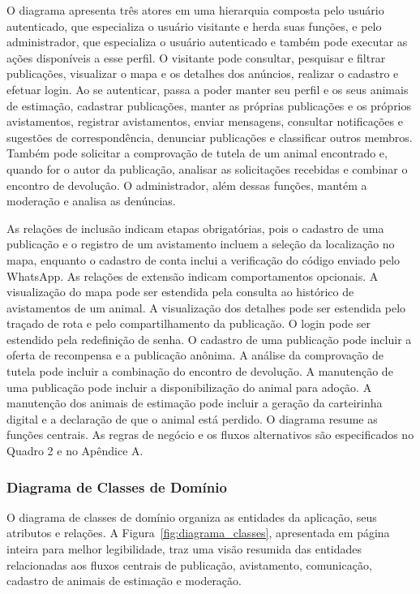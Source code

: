 O diagrama apresenta três atores em uma hierarquia composta pelo usuário autenticado, que especializa o usuário visitante e herda suas funções, e pelo administrador, que especializa o usuário autenticado e também pode executar as ações disponíveis a esse perfil. O visitante pode consultar, pesquisar e filtrar publicações, visualizar o mapa e os detalhes dos anúncios, realizar o cadastro e efetuar login. Ao se autenticar, passa a poder manter seu perfil e os seus animais de estimação, cadastrar publicações, manter as próprias publicações e os próprios avistamentos, registrar avistamentos, enviar mensagens, consultar notificações e sugestões de correspondência, denunciar publicações e classificar outros membros. Também pode solicitar a comprovação de tutela de um animal encontrado e, quando for o autor da publicação, analisar as solicitações recebidas e combinar o encontro de devolução. O administrador, além dessas funções, mantém a moderação e analisa as denúncias.

As relações de inclusão indicam etapas obrigatórias, pois o cadastro de uma publicação e o registro de um avistamento incluem a seleção da localização no mapa, enquanto o cadastro de conta inclui a verificação do código enviado pelo WhatsApp. As relações de extensão indicam comportamentos opcionais. A visualização do mapa pode ser estendida pela consulta ao histórico de avistamentos de um animal. A visualização dos detalhes pode ser estendida pelo traçado de rota e pelo compartilhamento da publicação. O login pode ser estendido pela redefinição de senha. O cadastro de uma publicação pode incluir a oferta de recompensa e a publicação anônima. A análise da comprovação de tutela pode incluir a combinação do encontro de devolução. A manutenção de uma publicação pode incluir a disponibilização do animal para adoção. A manutenção dos animais de estimação pode incluir a geração da carteirinha digital e a declaração de que o animal está perdido. O diagrama resume as funções centrais. As regras de negócio e os fluxos alternativos são especificados no Quadro 2 e no Apêndice A.

\subsubsection{Diagrama de Classes de Domínio}

O diagrama de classes de domínio organiza as entidades da aplicação, seus atributos e relações. A Figura~\ref{fig:diagrama_classes}, apresentada em página inteira para melhor legibilidade, traz uma visão resumida das entidades relacionadas aos fluxos centrais de publicação, avistamento, comunicação, cadastro de animais de estimação e moderação.

